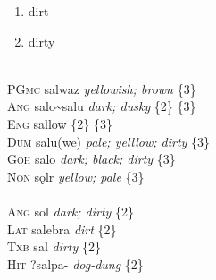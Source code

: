 \begin{enumerate}
\item{dirt}
\item{dirty}
\end{enumerate}

\noindent\textbf{}\\
\noindent\-\textsc{PGmc} salwaz \emph{yellowish; brown} \{3\}\\
\noindent\-\hspace{2em}\textsc{Ang} salo\textasciitilde salu \emph{dark; dusky} \{2\} \{3\}\\
\noindent\-\hspace{4em}\textsc{Eng} sallow \{2\} \{3\}\\
\noindent\-\hspace{2em}\textsc{Dum} salu(we) \emph{pale; yelllow; dirty} \{3\}\\
\noindent\-\hspace{2em}\textsc{Goh} salo \emph{dark; black; dirty} \{3\}\\
\noindent\-\hspace{2em}\textsc{Non} sǫlr  \emph{yellow; pale} \{3\}\\
\noindent\textbf{}\\
\noindent\-\textsc{Ang} sol \emph{dark; dirty} \{2\}\\
\noindent\-\textsc{Lat} salebra \emph{dirt} \{2\}\\
\noindent\-\textsc{Txb} sal \emph{dirty} \{2\}\\
\noindent\-\textsc{Hit} ?salpa- \emph{dog-dung} \{2\}\\


